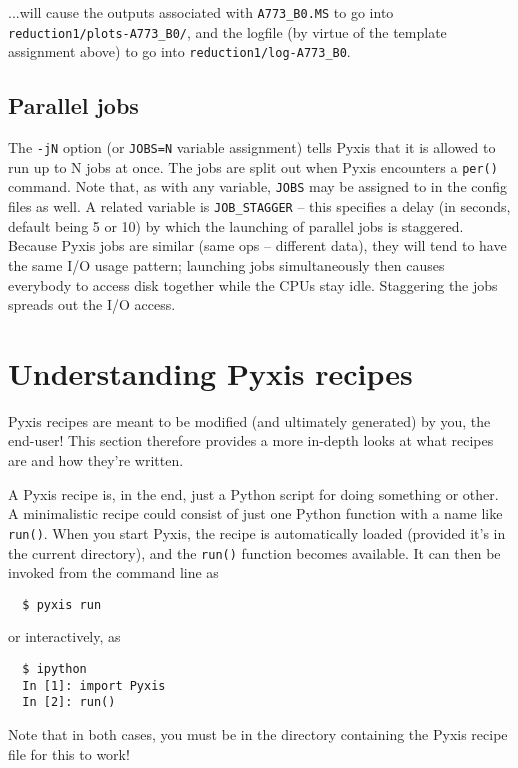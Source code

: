\documentclass[a4paper,10pt]{article}
\begin{document}
...will cause the outputs associated with {\tt A773\_B0.MS} to go into {\tt reduction1/plots-A773\_B0/}, and the logfile (by virtue of the template assignment above) to go into {\tt reduction1/log-A773\_B0}.

\subsection{Parallel jobs}

The {\tt -jN} option (or {\tt JOBS=N} variable assignment) tells Pyxis that it is allowed to run up to N jobs at once. The jobs are split out when Pyxis encounters a {\tt per()} command. Note that, as with any variable, {\tt JOBS} may be assigned to in the config files as well. A related variable is {\tt JOB\_STAGGER} -- this specifies a delay (in seconds, default being 5 or 10) by which the launching of parallel jobs is staggered. Because Pyxis jobs are similar (same ops -- different data), they will tend to have the same I/O usage pattern; launching jobs simultaneously then causes everybody to access disk together while the CPUs stay idle. Staggering the jobs spreads out the I/O access.

\section{Understanding Pyxis recipes}

Pyxis recipes are meant to be modified (and ultimately generated) by you, the end-user! This section therefore provides a more in-depth looks at what recipes are and how they're written.

A Pyxis recipe is, in the end, just a Python script for doing something or other. A minimalistic recipe could consist of just one Python function with a name like {\tt run()}. When you start Pyxis, the recipe is automatically loaded (provided it's in the current directory), and the {\tt run()} function becomes available. It can then be invoked from the command line as

\begin{verbatim}
  $ pyxis run
\end{verbatim}

or interactively, as

\begin{verbatim}
  $ ipython
  In [1]: import Pyxis
  In [2]: run()
\end{verbatim}

Note that in both cases, you must be in the directory containing the Pyxis recipe file for this to work!
\end{document}
